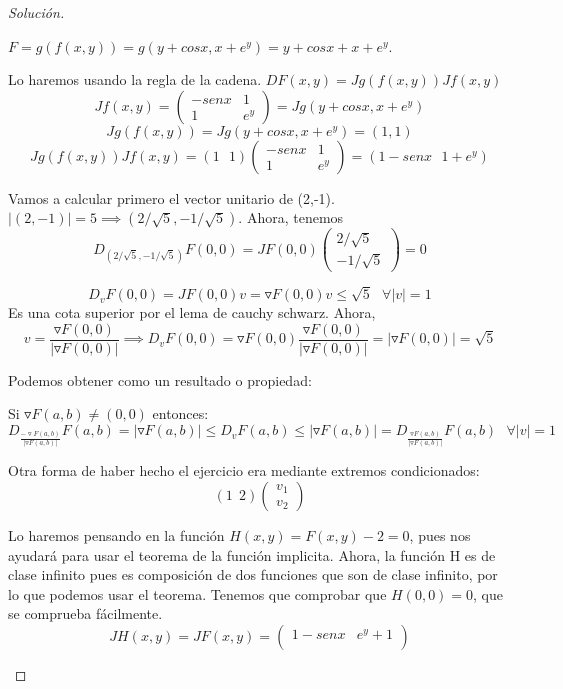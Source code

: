 \begin{proof}[Solución]
	\begin{nlist}
	\item $F=g(f(x,y)) = g(y+cosx,x+e^y) = y+cosx+x+e^y$.

	Lo haremos usando la regla de la cadena. $DF(x,y) = Jg(f(x,y))Jf(x,y)$
	\[
	Jf(x,y)= \begin{pmatrix}
 -senx & 1 \\
 1 & e^y
\end{pmatrix} = Jg(y+cosx,x+e^y)
	\]
	\[
	Jg(f(x,y))=Jg(y+cosx,x+e^y) = (1,1)
	\]
	\[
	Jg(f(x,y))Jf(x,y) = (1 \ \ \ 1)\begin{pmatrix}
 -senx & 1 \\
 1 & e^y
\end{pmatrix} = (1- senx \ \ \ 1+e^y)
	\]

	\item Vamos a calcular primero el vector unitario de (2,-1). $|(2,-1)| = 5 \implies (2/\sqrt5, -1/ \sqrt5)$. Ahora, tenemos
	\[
	D_{ (2/\sqrt5, -1/ \sqrt5)}F(0,0) = JF(0,0) \begin{pmatrix}
 2/\sqrt 5  \\
 -1/\sqrt5
\end{pmatrix} = 0
	\]

	\item \[
	D_vF(0,0) = JF(0,0) v =  \triangledown F(0,0) v \leq \sqrt 5 \ \ \ \forall |v| = 1	\]
	Es una cota superior por el lema de cauchy schwarz.
	Ahora, \[
	v = \frac{\triangledown F(0,0)}{|\triangledown F(0,0)|} \implies D_v F(0,0) = \triangledown F(0,0)  \frac{\triangledown F(0,0)}{|\triangledown F(0,0)|} = |\triangledown F(0,0)| = \sqrt 5
	\]

	Podemos obtener como un resultado o propiedad:

	\begin{nprop}
	Si $\triangledown F(a,b) \ne (0,0)$ entonces:
	\[
	D_{ \frac{-\triangledown F(a,b)}{|\triangledown F(a,b)|}}F(a,b) =  |\triangledown F(a,b)| \leq D_v F(a,b) \leq |\triangledown F(a,b)| = D_{ \frac{\triangledown F(a,b)}{|\triangledown F(a,b)|}}F(a,b) \ \ \ \forall |v| = 1
	\]
\end{nprop}

Otra forma de haber hecho el ejercicio era mediante extremos condicionados:
\[
(1 \ \ 2) \begin{pmatrix}
 v_1 \\
 v_2
\end{pmatrix}
\]

\item Lo haremos pensando en la función $H(x,y) =F(x,y)-2 = 0$, pues nos ayudará para usar el teorema de la función implicita. Ahora, la función H es de clase infinito pues es composición de dos funciones que son de clase infinito, por lo que podemos usar el teorema. Tenemos que comprobar que $H(0,0) = 0$, que se comprueba fácilmente.
\[
JH(x,y) = JF(x,y) = \begin{pmatrix}
 1-senx & e^y+1 \\


\end{pmatrix}\]
\end{nlist}
\end{proof}
